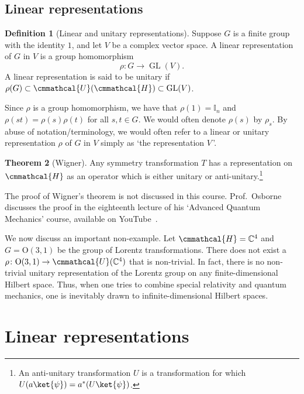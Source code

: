 \documentclass[a4 paper, 12pt]{book}
\renewcommand{\mathcal}{\cmmathcal}
\theoremstyle{definition}
\newtheorem{theorem}{Theorem}[section]
\newtheorem{definition}[theorem]{Definition}
\newcommand{\cc}{\mathbb{C}}
\newcommand{\ii}{\mathbb{I}}
\DeclareMathOperator{\GL}{GL}
\newcommand{\hilbert}{\mathcal{H}}
\newcommand{\unitary}{\mathcal{U}}
\newcommand{\ortho}{\mathrm{O}}
\newcommand{\lorentz}{\ortho{(3,1)}}
\begin{document}
	\section{Linear representations}

	\begin{definition}[Linear and unitary representations]
		Suppose \(G\) is a finite group with the identity \(1\), and let \(V\) be a complex vector space. A linear representation of \(G\) in \(V\) is a group homomorphism
		\begin{equation*}
		    \rho \colon G \rightarrow \GL(V).
		\end{equation*}
		A linear representation is said to be unitary if \(\rho(G) \subset \unitary(\hilbert) \subset \GL(V)\).
	\end{definition}
	\noindent Since \(\rho\) is a group homomorphism, we have that \(\rho(1) = \ii_n\) and \(\rho(st) = \rho(s) \rho(t)\) for all \(s, t \in G\). We would often denote \(\rho(s)\) by \(\rho_s\). By abuse of notation/terminology, we would often refer to a linear or unitary representation \(\rho\) of \(G\) in \(V\) simply as `the representation \(V\)\,'.
	\begin{theorem}[Wigner]
		Any symmetry transformation \(T\) has a representation on \(\hilbert\) as an operator which is either unitary or anti-unitary.\footnote{An anti-unitary transformation \(U\) is a transformation for which \(U(a\ket{\psi}) = a^*(U\ket{\psi})\).}
	\end{theorem}
	The proof of Wigner's theorem is not discussed in this course. Prof.\ Osborne discusses the proof in the eighteenth lecture of his `Advanced Quantum Mechanics' course, available on YouTube~\cite{Osborne_wigner}.

	We now discuss an important non-example. Let \(\hilbert = \cc^4\) and \(G = \lorentz\) be the group of Lorentz transformations. There does not exist a \(\rho \colon \lorentz \rightarrow \unitary(\cc^4)\) that is non-trivial. In fact, there is no non-trivial unitary representation of the Lorentz group on any finite-dimensional Hilbert space. Thus, when one tries to combine special relativity and quantum mechanics, one is inevitably drawn to infinite-dimensional Hilbert spaces.

	\chapter{Linear representations}
\end{document}
